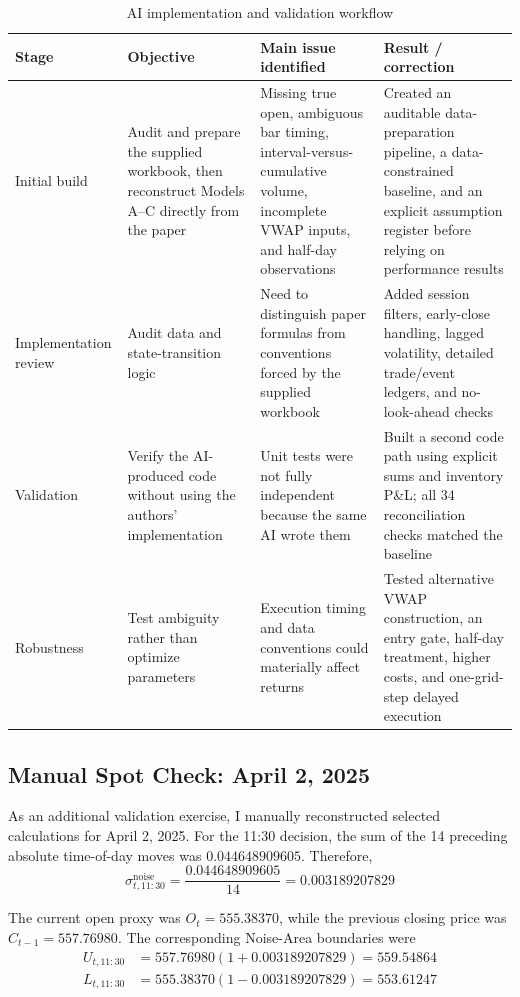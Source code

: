 \documentclass{article}
\begin{document}
\begin{table}[H]
\centering
\caption{AI implementation and validation workflow}
\label{tab:prompt_history}
\begin{tabular}{p{}p{}p{}p{}}
\toprule
Stage & Objective & Main issue identified & Result / correction \\
\midrule
Initial build & Audit and prepare the supplied workbook, then reconstruct Models A--C directly from the paper & Missing true open, ambiguous bar timing, interval-versus-cumulative volume, incomplete VWAP inputs, and half-day observations & Created an auditable data-preparation pipeline, a data-constrained baseline, and an explicit assumption register before relying on performance results \\
Implementation review & Audit data and state-transition logic & Need to distinguish paper formulas from conventions forced by the supplied workbook & Added session filters, early-close handling, lagged volatility, detailed trade/event ledgers, and no-look-ahead checks \\
Validation & Verify the AI-produced code without using the authors' implementation & Unit tests were not fully independent because the same AI wrote them & Built a second code path using explicit sums and inventory P\&L; all 34 reconciliation checks matched the baseline \\
Robustness & Test ambiguity rather than optimize parameters & Execution timing and data conventions could materially affect returns & Tested alternative VWAP construction, an entry gate, half-day treatment, higher costs, and one-grid-step delayed execution \\
\bottomrule
\end{tabular}
\end{table}

\subsection{Manual Spot Check: April 2, 2025}

As an additional validation exercise, I manually reconstructed selected calculations for April 2, 2025. For the 11:30 decision, the sum of the 14 preceding absolute time-of-day moves was \(0.044648909605\). Therefore,
\[
    \sigma^{\text{noise}}_{t,11:30}
    =
    \frac{0.044648909605}{14}
    =
    0.003189207829
\]

The current open proxy was \(O_t = 555.38370\), while the previous closing price was \(C_{t-1}=557.76980\). The corresponding Noise-Area boundaries were
\[
\begin{aligned}
    U_{t,11:30}
    &=
    557.76980
    \left(1+0.003189207829\right)
    =
    559.54864 \\
    L_{t,11:30}
    &=
    555.38370
    \left(1-0.003189207829\right)
    =
    553.61247
\end{aligned}
\]
\end{document}
